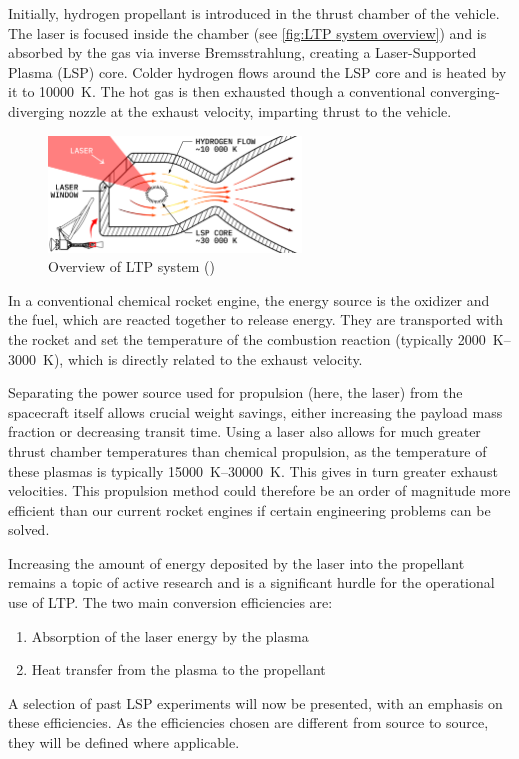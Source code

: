         Initially, hydrogen propellant is introduced in the thrust chamber of the vehicle. The laser is focused inside the chamber (see \autoref{fig:LTP system overview}) and is absorbed by the gas via inverse Bremsstrahlung, creating a Laser-Supported Plasma (LSP) core. Colder hydrogen flows around the LSP core and is heated by it to \qty{10000}{K}. The hot gas is then exhausted though a conventional converging-diverging nozzle at the exhaust velocity, imparting thrust to the vehicle.

        \begin{figure}[!ht]
            \centering
            \includegraphics[width=0.6\textwidth]{assets/2 background/chamber.pdf}
            \caption{Overview of LTP system (\textcite{duplayArgonLaserPlasmaThruster2024a})}
            \label{fig:LTP system overview}
        \end{figure}

        In a conventional chemical rocket engine, the energy source is the oxidizer and the fuel, which are reacted together to release energy. They are transported with the rocket and set the temperature of the combustion reaction (typically \qtyrange{2000}{3000}{K}), which is directly related to the exhaust velocity.
        
        Separating the power source used for propulsion (here, the laser) from the spacecraft itself allows crucial weight savings, either increasing the payload mass fraction or decreasing transit time. Using a laser also allows for much greater thrust chamber temperatures than chemical propulsion, as the temperature of these plasmas is typically \qtyrange{15000}{30000}{K}. This gives in turn greater exhaust velocities. This propulsion method could therefore be an order of magnitude more efficient than our current rocket engines if certain engineering problems can be solved.

        Increasing the amount of energy deposited by the laser into the propellant remains a topic of active research and is a significant hurdle for the operational use of LTP. The two main conversion efficiencies are:
        \begin{enumerate}
            \item Absorption of the laser energy by the plasma
            \item Heat transfer from the plasma to the propellant
        \end{enumerate}
        A selection of past LSP experiments will now be presented, with an emphasis on these efficiencies. As the efficiencies chosen are different from source to source, they will be defined where applicable.
    
